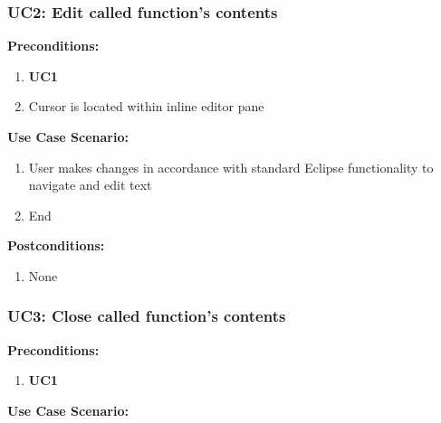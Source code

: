 \documentclass[]{report}
\begin{document}
		\vspace{0.25in}
			
		\subsubsection{UC2:  Edit called function's contents}
		
			\textbf{Preconditions:}
		
				\begin{enumerate}
					
					\item \textbf{UC1}
					
					\item Cursor is located within inline editor pane
					
				\end{enumerate}
		
			\noindent\textbf{Use Case Scenario:}
			
				\begin{enumerate}
					\item
					User makes changes in accordance with standard Eclipse functionality to navigate and edit text
					
					\item
					End
				\end{enumerate}
			
			\noindent\textbf{Postconditions:}
			
				\begin{enumerate}
					
					\item 
					None
					
				\end{enumerate}
			
		\vspace{0.25in}
		
		\subsubsection{UC3:  Close called function's contents}
		
		\textbf{Preconditions:}
		
		\begin{enumerate}
			
			\item \textbf{UC1}
			
		\end{enumerate}
		
		\noindent\textbf{Use Case Scenario:}
		
\end{document}
